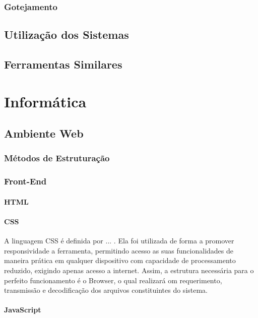 \documentclass[12pt,a4paper]{book}
\begin{document}
\subsection{Gotejamento}


\section{Utilização dos Sistemas}

\section{Ferramentas Similares}



\chapter{Informática}

\section{Ambiente Web}
\subsection{Métodos de Estruturação}

\subsection{Front-End}
\subsubsection{HTML}

\subsubsection{CSS}
A linguagem CSS é definida por ... . Ela foi utilizada de forma a promover responsividade a ferramenta, permitindo acesso as suas funcionalidades de maneira prática em qualquer dispositivo com capacidade de processamento reduzido, exigindo apenas acesso a internet. Assim, a estrutura necessária para o perfeito funcionamento é o Browser, o qual realizará om requerimento, transmissão e decodificação dos arquivos constituintes do sistema.
\subsubsection{JavaScript}
\end{document}
